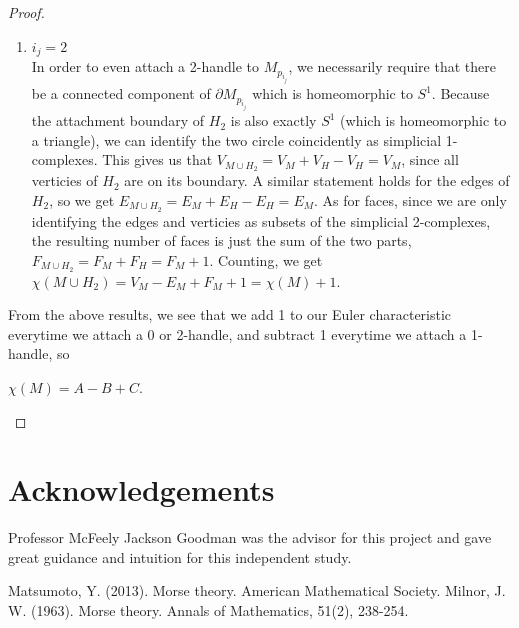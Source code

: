 \documentclass[12pt]{article}
\theoremstyle{definition}
\begin{document}
\begin{proof}
\begin{enumerate}
            \item $i_j = 2$\\
            In order to even attach a 2-handle to $M_{p_{i_j}}$, we necessarily require that there be a connected component of $\partial M_{p_{i_j}}$ which is homeomorphic to $S^1$. Because the attachment boundary of $H_2$ is also exactly $S^1$ (which is homeomorphic to a triangle), we can identify the two circle coincidently as simplicial 1-complexes. This gives us that $V_{M\cup H_2} = V_M + V_H - V_H = V_M$, since all verticies of $H_2$ are on its boundary. A similar statement holds for the edges of $H_2$, so we get $E_{M\cup H_2} = E_M + E_H - E_H = E_M$. As for faces, since we are only identifying the edges and verticies as subsets of the simplicial 2-complexes, the resulting number of faces is just the sum of the two parts, $F_{M\cup H_2} = F_M + F_H = F_M + 1$. Counting, we get $\chi(M\cup H_2) = V_M -E_M + F_M +1 = \chi(M) + 1$. 
      \end{enumerate}

      From the above results, we see that we add 1 to our Euler characteristic everytime we attach a 0 or 2-handle, and subtract 1 everytime we attach a 1-handle, so 
      \begin{center}
            $\chi(M) = A-B+C$. 
      \end{center}
\end{proof}

\section{Acknowledgements}

Professor McFeely Jackson Goodman was the advisor for this project and gave great guidance and intuition for this independent study. 

\begin{thebibliography}{9}
	Matsumoto, Y. (2013). Morse theory. American Mathematical Society.
	Milnor, J. W. (1963). Morse theory. Annals of Mathematics, 51(2), 238-254.
\end{thebibliography}
\end{document}
